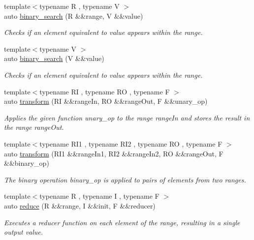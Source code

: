 \begin{DoxyCompactItemize}
{\footnotesize template$<$typename R , typename V $>$ }\\auto \mbox{\hyperlink{namespacerah_a5eef379d9f3039fd12f43d5220434976}{binary\+\_\+search}} (R \&\&range, V \&\&value)
\begin{DoxyCompactList}\small\item\em Checks if an element equivalent to value appears within the range. \end{DoxyCompactList}\item 
{\footnotesize template$<$typename V $>$ }\\auto \mbox{\hyperlink{namespacerah_a8ac532c28d2c52c80adf91a7b8829bd6}{binary\+\_\+search}} (V \&\&value)
\begin{DoxyCompactList}\small\item\em Checks if an element equivalent to value appears within the range. \end{DoxyCompactList}\item 
{\footnotesize template$<$typename RI , typename RO , typename F $>$ }\\auto \mbox{\hyperlink{namespacerah_a7cb27bf7219a7ee4b47cc9da217810a8}{transform}} (RI \&\&range\+In, RO \&\&range\+Out, F \&\&unary\+\_\+op)
\begin{DoxyCompactList}\small\item\em Applies the given function unary\+\_\+op to the range range\+In and stores the result in the range range\+Out. \end{DoxyCompactList}\item 
{\footnotesize template$<$typename R\+I1 , typename R\+I2 , typename RO , typename F $>$ }\\auto \mbox{\hyperlink{namespacerah_a7bac191e66e0d3f3823e0c08382f0418}{transform}} (R\+I1 \&\&range\+In1, R\+I2 \&\&range\+In2, RO \&\&range\+Out, F \&\&binary\+\_\+op)
\begin{DoxyCompactList}\small\item\em The binary operation binary\+\_\+op is applied to pairs of elements from two ranges. \end{DoxyCompactList}\item 
{\footnotesize template$<$typename R , typename I , typename F $>$ }\\auto \mbox{\hyperlink{namespacerah_a407b50a4f029e3f2a3cd0ba9142aea84}{reduce}} (R \&\&range, I \&\&init, F \&\&reducer)
\begin{DoxyCompactList}\small\item\em Executes a reducer function on each element of the range, resulting in a single output value. \end{DoxyCompactList}\item 

\end{DoxyCompactItemize}

